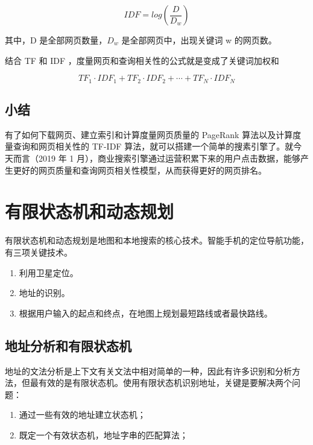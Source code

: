 \documentclass[11pt]{article}
\begin{document}
\begin{equation}
IDF = log \left(\frac{D}{D_{w}} \right)
\end{equation}

其中，D 是全部网页数量，\(D_{w}\) 是全部网页中，出现关键词 w 的网页数。

结合 TF 和 IDF ，度量网页和查询相关性的公式就是变成了关键词加权和

\begin{equation}
TF_{1} \cdot IDF_{1} + TF_{2} \cdot IDF_{2} + \cdots + TF_{N} \cdot IDF_{N}
\end{equation}

\subsection{小结}
\label{sec:org91560ed}
有了如何下载网页、建立索引和计算度量网页质量的 PageRank 算法以及计算度量查询和网页相关性的 TF-IDF 算法，就可以搭建一个简单的搜素引擎了。就今天而言（2019 年 1 月），商业搜索引擎通过运营积累下来的用户点击数据，能够产生更好的网页质量和查询网页相关性模型，从而获得更好的网页排名。

\section{有限状态机和动态规划}
\label{sec:orgfefbb5b}
有限状态机和动态规划是地图和本地搜索的核心技术。智能手机的定位导航功能，有三项关键技术。

\begin{enumerate}
\item 利用卫星定位。
\item 地址的识别。
\item 根据用户输入的起点和终点，在地图上规划最短路线或者最快路线。
\end{enumerate}

\subsection{地址分析和有限状态机}
\label{sec:orga8fce1e}
地址的文法分析是上下文有关文法中相对简单的一种，因此有许多识别和分析方法，但最有效的是有限状态机。使用有限状态机识别地址，关键是要解决两个问题：

\begin{enumerate}
\item 通过一些有效的地址建立状态机；
\item 既定一个有效状态机，地址字串的匹配算法；
\end{enumerate}
\end{document}
